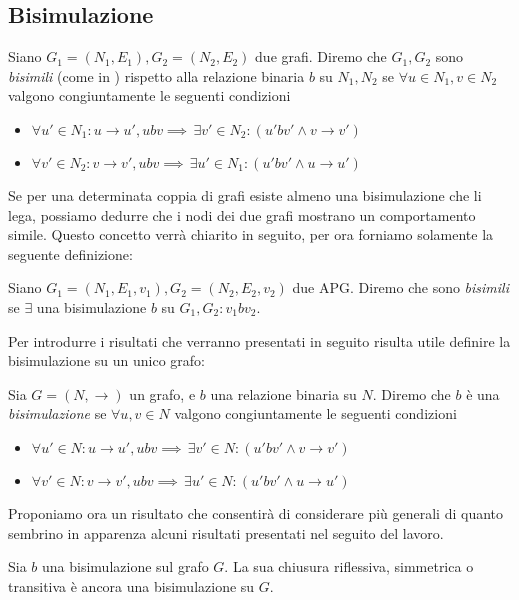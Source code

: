 \subsection{Bisimulazione}
\begin{definition}
    Siano $G_1 = (N_1, E_1), G_2 = (N_2, E_2)$ due grafi. Diremo che $G_1, G_2$ sono \textit{bisimili} (come in \cite{dovier}) rispetto alla relazione binaria $b$ su $N_1, N_2$ se $\forall u \in N_1, v \in N_2$ valgono congiuntamente le seguenti condizioni
    \begin{itemize}
        \item $\forall u' \in N_1 : u \to u', u b v \implies \,\exists v' \in N_2 : (u' b v' \land v \to v')$
        \item $\forall v' \in N_2 : v \to v', u b v \implies \,\exists u' \in N_1 : (u' b v' \land u \to u')$
    \end{itemize}
\end{definition}
Se per una determinata coppia di grafi esiste almeno una bisimulazione che li lega, possiamo dedurre che i nodi dei due grafi mostrano un comportamento simile.
Questo concetto verrà chiarito in seguito, per ora forniamo solamente la seguente definizione:
\begin{definition}
    Siano $G_1 = (N_1, E_1, v_1), G_2 = (N_2, E_2, v_2)$ due APG. Diremo che sono \textit{bisimili} se $\exists$ una bisimulazione $b$ su $G_1, G_2 : v_1 b v_2$.
\end{definition}
Per introdurre i risultati che verranno presentati in seguito risulta utile definire la bisimulazione su un unico grafo:
\begin{definition}
    Sia $G = (N, \to)$ un grafo, e $b$ una relazione binaria su $N$. Diremo che $b$ è una \textit{bisimulazione} se $\forall u,v \in N$ valgono congiuntamente le seguenti condizioni
    \begin{itemize}
        \item $\forall u' \in N : u \to u', u b v \implies \,\exists v' \in N : (u' b v' \land v \to v')$
        \item $\forall v' \in N : v \to v', u b v \implies \,\exists u' \in N : (u' b v' \land u \to u')$
    \end{itemize}
\end{definition}
Proponiamo ora un risultato che consentirà di considerare più generali di quanto sembrino in apparenza alcuni risultati presentati nel seguito del lavoro.
\begin{theorem}
    Sia $b$ una bisimulazione sul grafo $G$. La sua chiusura riflessiva, simmetrica o transitiva è ancora una bisimulazione su $G$.
\end{theorem}
